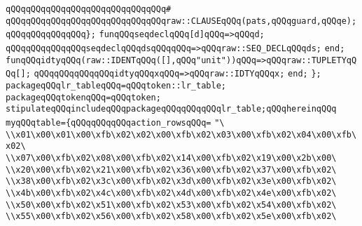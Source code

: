 \verb|qQQqqQQqqQQqqQQqqQQqqQQqqQQqqQQq#|\newline
\verb|qQQqqQQqqQQqqQQqqQQqqQQqqQQqqQQqraw::CLAUSEqQQq(pats,qQQqguard,qQQqe);|\newline
\verb|qQQqqQQqqQQqqQQq};|\newline
\newline
\verb|funqQQqseqdeclqQQq[d]qQQq=>qQQqd;|\newline
\verb|qQQqqQQqqQQqqQQqseqdeclqQQqdsqQQqqQQq=>qQQqraw::SEQ_DECLqQQqds;|\newline
\verb|end;|\newline
\newline
\verb|funqQQqidtyqQQq(raw::IDENTqQQq([],qQQq"unit"))qQQq=>qQQqraw::TUPLETYqQQq[];|\newline
\verb|qQQqqQQqqQQqqQQqidtyqQQqxqQQq=>qQQqraw::IDTYqQQqx;|\newline
\verb|end;|\newline
\newline
\newline
\verb|};|\newline
\verb|packageqQQqlr_tableqQQq=qQQqtoken::lr_table;|\newline
\verb|packageqQQqtokenqQQq=qQQqtoken;|\newline
\verb|stipulateqQQqincludeqQQqpackageqQQqqQQqqQQqlr_table;qQQqhereinqQQq|\newline
\verb|myqQQqtable={qQQqqQQqqQQqaction_rowsqQQq=|\newline
\verb|"\|\newline
\verb|\\x01\x00\x01\x00\xfb\x02\x02\x00\xfb\x02\x03\x00\xfb\x02\x04\x00\xfb\x02\|\newline
\verb|\\x07\x00\xfb\x02\x08\x00\xfb\x02\x14\x00\xfb\x02\x19\x00\x2b\x00\|\newline
\verb|\\x20\x00\xfb\x02\x21\x00\xfb\x02\x36\x00\xfb\x02\x37\x00\xfb\x02\|\newline
\verb|\\x38\x00\xfb\x02\x3c\x00\xfb\x02\x3d\x00\xfb\x02\x3e\x00\xfb\x02\|\newline
\verb|\\x4b\x00\xfb\x02\x4c\x00\xfb\x02\x4d\x00\xfb\x02\x4e\x00\xfb\x02\|\newline
\verb|\\x50\x00\xfb\x02\x51\x00\xfb\x02\x53\x00\xfb\x02\x54\x00\xfb\x02\|\newline
\verb|\\x55\x00\xfb\x02\x56\x00\xfb\x02\x58\x00\xfb\x02\x5e\x00\xfb\x02\|\newline
